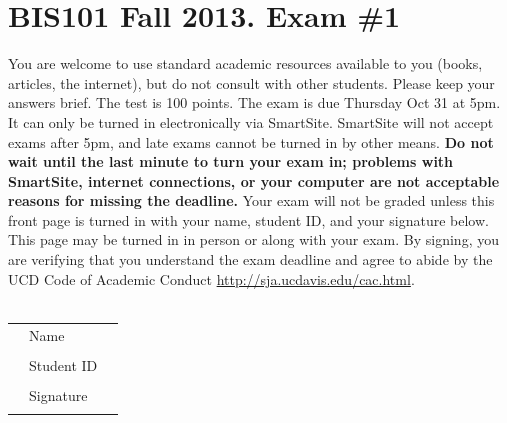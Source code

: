 \documentclass[]{article}
\begin{document}
\section*{BIS101 Fall 2013. Exam \#1}
You are welcome to use standard academic resources available to you (books, articles, the internet), but do not consult with other students.  Please keep your answers brief.  The test is 100 points. The exam is due Thursday Oct 31 at 5pm.  It can only be turned in electronically via SmartSite.  SmartSite will not accept exams after 5pm, and late exams cannot be turned in by other means. {\bf Do not wait until the last minute to turn your exam in; problems with SmartSite, internet connections, or your computer are not acceptable reasons for missing the deadline.}  Your exam will not be graded unless this front page is turned in with your name, student ID, and your signature below.  This page may be turned in in person or along with your exam. By signing, you are verifying that you understand the exam deadline and agree to abide by the UCD Code of Academic Conduct \url{http://sja.ucdavis.edu/cac.html}.  \\
\vspace{2cm} \\

\begin{tabular}{lll}
& Name & \underline{\hspace{5cm}} \\
\vspace{2cm} \\
& Student ID & \underline{\hspace{5cm}} \\
\vspace{2cm} \\
& Signature & \underline{\hspace{5cm}} \\
\vspace{2cm} \\
\end{tabular}
\end{document}
